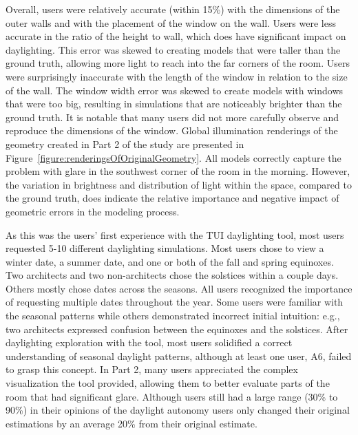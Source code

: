\documentclass[preprint]{elsarticle}
\begin{document}
Overall, users were relatively accurate (within 15\%) with the
dimensions of the outer walls and with the placement of the window on
the wall.  Users were less accurate in the ratio of the height to
wall, which does have significant impact on daylighting.  
This error was skewed to creating models that were taller than the
ground truth, allowing more light 
to reach
 into the far corners of the
room.  
%
Users were surprisingly inaccurate with the length of the window in
relation to the size of the wall.  The window width error was skewed
to create models with windows that were too big, resulting in
simulations that are noticeably brighter than the ground truth.
It is notable that many users did not 
more 
carefully observe and
reproduce the dimensions of the window.  
%
Global illumination renderings of the geometry created in Part 2 of
the study are presented in
Figure~\ref{figure:renderingsOfOriginalGeometry}.  All models
correctly capture the problem with glare in the southwest corner of
the room in the morning.  However, the variation in brightness and
distribution of light within the space, compared to the ground truth,
does indicate the relative importance and negative impact of geometric
errors in the modeling process.


As this was the users' first experience with the TUI daylighting tool,
most users requested 5-10 different daylighting simulations.  Most
users chose to view a winter date, a summer date, and one or both of
the fall and spring equinoxes.  Two architects and two non-architects
chose the solstices within a couple days.  Others mostly chose dates
across the seasons.  All users recognized the importance of requesting
multiple dates throughout the year.  Some users were familiar with the
seasonal patterns while others demonstrated incorrect initial
intuition: e.g., two architects expressed confusion between the
equinoxes and the solstices.  After daylighting exploration with the
tool, most users solidified a correct understanding of seasonal
daylight patterns, although at least one user, A6, failed to grasp
this concept.  In Part 2, many users appreciated the complex
visualization the tool provided, allowing them to better evaluate
parts of the room that had significant glare.  Although users still
had a large range (30\% to 90\%) in their opinions of the daylight
autonomy users only changed their original estimations by an average
20\% from their original estimate.  
\end{document}
